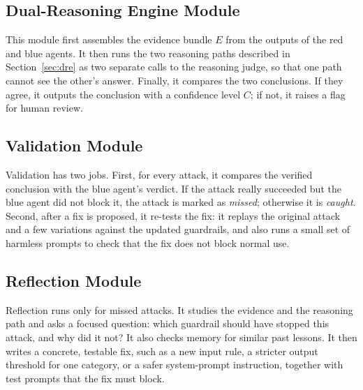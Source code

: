\subsection{Dual-Reasoning Engine Module}
This module first assembles the evidence bundle $E$ from the outputs of the red
and blue agents. It then runs the two reasoning paths described in
Section~\ref{sec:dre} as two separate calls to the reasoning judge, so that one
path cannot see the other's answer. Finally, it compares the two conclusions.
If they agree, it outputs the conclusion with a confidence level $C$; if not, it
raises a flag for human review.

\subsection{Validation Module}
Validation has two jobs. First, for every attack, it compares the verified
conclusion with the blue agent's verdict. If the attack really succeeded but the
blue agent did not block it, the attack is marked as \emph{missed}; otherwise it
is \emph{caught}. Second, after a fix is proposed, it re-tests the fix: it replays
the original attack and a few variations against the updated guardrails, and also
runs a small set of harmless prompts to check that the fix does not block normal
use.

\subsection{Reflection Module}
Reflection runs only for missed attacks. It studies the evidence and the
reasoning path and asks a focused question: which guardrail should have stopped
this attack, and why did it not? It also checks memory for similar past lessons.
It then writes a concrete, testable fix, such as a new input rule, a stricter
output threshold for one category, or a safer system-prompt instruction, together
with test prompts that the fix must block.


